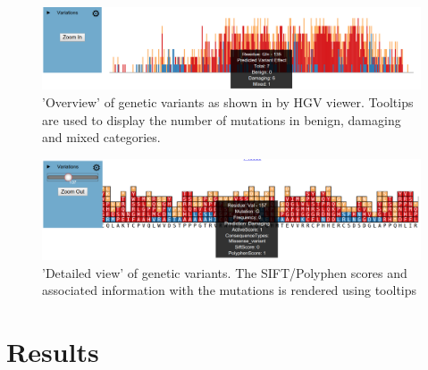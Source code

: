 \documentclass[twoside]{article}
\begin{document}
\begin{multicols}{2}
\begin{figure}
\includegraphics[width=\linewidth]{overview_withtooltip}
\caption{'Overview' of genetic variants as shown in by HGV viewer. Tooltips are used to display the number of mutations in benign, damaging and mixed categories.}
\end{figure}
\begin{figure}
\includegraphics[width=\linewidth]{zoomed_withtooltip}
\caption{'Detailed view' of genetic variants. The SIFT/Polyphen scores and associated information with the mutations is rendered using tooltips}
\end{figure}




\section{Results}




\end{multicols}
\end{document}
